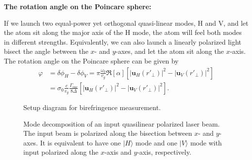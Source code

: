 \documentclass[]{report}
\begin{document}
\bigskip
\textbf{The rotation angle on the Poincare sphere:}

If we launch two equal-power yet orthogonal quasi-linear modes, H and V, and let the atom sit along the major axis of the H mode, the atom will feel both modes in different strengths. Equivalently, we can also launch a linearly polarized light bisect the angle between the $ x $- and $ y $-axes, and let the atom sit along the $ x $-axis. The rotation angle on the Poincare sphere can be given by
\begin{align}
\varphi &= \delta\phi_H-\delta\phi_V= \pi \frac{\omega_0}{v_g} \Re[\alpha] \left[| \mathbf{u}_H(r'_{\!\perp})|^2- | \mathbf{u}_V(r'_{\!\perp})|^2 \right]\\
&= \sigma_0\frac{c}{v_g}\frac{\Gamma_{vac}}{8\Delta}\left[| \mathbf{u}_H(r'_{\!\perp})|^2- | \mathbf{u}_V(r'_{\!\perp})|^2 \right].\label{eq:Faradayrotang}
\end{align}

\begin{figure}
\centering{}
\caption{Setup diagram for birefringence measurement.}
\end{figure}

\begin{figure}
\centering{}
\caption{Mode decomposition of an input quasilinear polarized laser beam. The input beam is polarized along the bisection between $ x $- and $ y $-axes. It is equivalent to have one $ |H\rangle $ mode and one $ |V\rangle $ mode with input polarized along the $ x $-axis and $ y $-axis, respectively.}
\end{figure}
\end{document}
